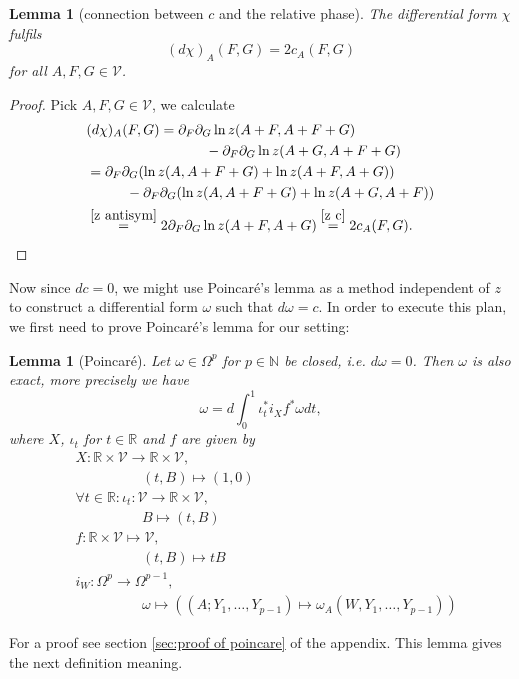 \documentclass[b5paper,draft,openbib,12pt]{memoir}
\newtheorem{Lemma}[Def]{Lemma}
\begin{document}
\begin{Lemma}[connection between \(c\) and the relative phase]\label{connection between c and the relative phase}
The differential form \(\chi\) fulfils 
\begin{equation}
(d\chi)_A(F,G)=2 c_A(F,G)
\end{equation}
for all \(A,F,G\in\mathcal{V}\).
\end{Lemma}
\begin{proof}
Pick \(A,F,G\in \mathcal{V}\), we calculate
\begin{align}\nonumber
&(d\chi)_A(F,G)=\partial_F\partial_G \ln z(A+F,A+F+G)\\
&\hspace{3cm}-\partial_F \partial_G \ln z(A+G,A+F+G)\\
&=\partial_F\partial_G (\ln  z(A,A+F+G)+\ln z(A+F,A+G))\\
 &\hspace{1cm} - \partial_F\partial_G(  \ln z(A,A+F+G)+\ln z(A+G,A+F))\\
&\overset{\eqref{z antisym}}{=} 2 \partial_F\partial_G \ln z(A+F,A+G)\overset{\eqref{z c}}{=}2 c_A(F,G).
\end{align}
\end{proof}

Now since \(d c=0\), we might use Poincaré's lemma as a method independent of \(z\) to construct a differential form \(\omega\) such that \(d\omega=c\). 
In order to execute this plan, we first need to prove Poincaré's lemma for our setting:

\begin{Lemma}[Poincaré]\label{lem poincare}
Let \(\omega\in \Omega^p\) for 
\(p\in\mathbb{N}\) be closed, i.e. \(d \omega =0\). 
Then \(\omega\) is also exact, more precisely we have
\begin{equation}
\omega=d \int_{0}^1 \iota^*_t i_X f^* \omega dt,
\end{equation}
where \(X\), \(\iota_t\) for \(t\in\mathbb{R}\) and \(f\) are given by
 \begin{align}
 &X: \mathbb{R}\times\mathcal{V}\rightarrow \mathbb{R}\times\mathcal{V},\\
 &\hspace{2cm} (t,B)\mapsto (1,0) \\
&\forall t \in \mathbb{R}: \iota_t: \mathcal{V}\rightarrow \mathbb{R}\times\mathcal{V},\\
&\hspace{2cm} B\mapsto (t,B)\\
&f:\mathbb{R}\times \mathcal{V}\mapsto \mathcal{V},\\
&\hspace{2cm} (t,B) \mapsto t B\\
&i_W: \Omega^p\rightarrow \Omega^{p-1},\\
&\hspace{2cm} \omega \mapsto ((A;Y_1,\dots, Y_{p-1})\mapsto \omega_A(W,Y_1,\dots,Y_{p-1}))
 \end{align}
\end{Lemma}
For a proof see section \ref{sec:proof of poincare} of the appendix. This 
lemma gives the next definition meaning.
\end{document}

